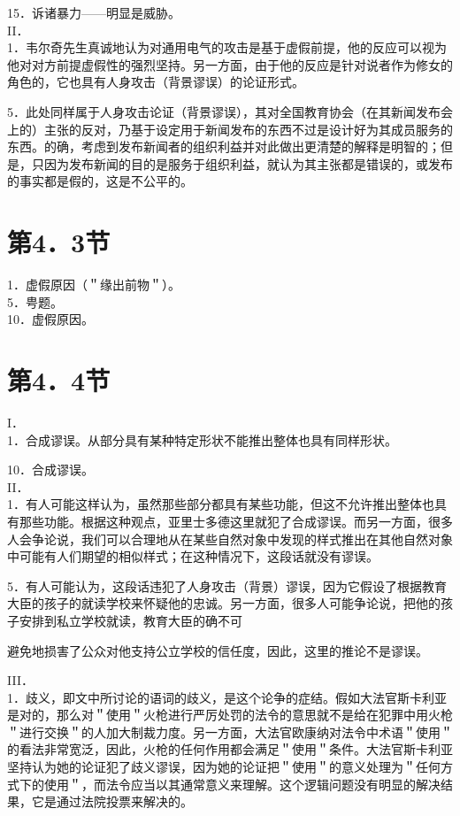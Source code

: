15．诉诸暴力——明显是威胁。\\
II．\\
1．韦尔奇先生真诚地认为对通用电气的攻击是基于虚假前提，他的反应可以视为他对对方前提虚假性的强烈坚持。另一方面，由于他的反应是针对说者作为修女的角色的，它也具有人身攻击（背景谬误）的论证形式。

5．此处同样属于人身攻击论证（背景谬误），其对全国教育协会（在其新闻发布会上的）主张的反对，乃基于设定用于新闻发布的东西不过是设计好为其成员服务的东西。的确，考虑到发布新闻者的组织利益并对此做出更清楚的解释是明智的；但是，只因为发布新闻的目的是服务于组织利益，就认为其主张都是错误的，或发布的事实都是假的，这是不公平的。

\section*{第4．3节}
1．虚假原因（＂缘出前物＂）。\\
5．甹题。\\
10．虚假原因。

\section*{第4．4节}
I．\\
1．合成谬误。从部分具有某种特定形状不能推出整体也具有同样形状。

10．合成谬误。\\
II．\\
1．有人可能这样认为，虽然那些部分都具有某些功能，但这不允许推出整体也具有那些功能。根据这种观点，亚里士多德这里就犯了合成谬误。而另一方面，很多人会争论说，我们可以合理地从在某些自然对象中发现的样式推出在其他自然对象中可能有人们期望的相似样式；在这种情况下，这段话就没有谬误。

5．有人可能认为，这段话违犯了人身攻击（背景）谬误，因为它假设了根据教育大臣的孩子的就读学校来怀疑他的忠诚。另一方面，很多人可能争论说，把他的孩子安排到私立学校就读，教育大臣的确不可

避免地损害了公众对他支持公立学校的信任度，因此，这里的推论不是谬误。

III．\\
1．歧义，即文中所讨论的语词的歧义，是这个论争的症结。假如大法官斯卡利亚是对的，那么对＂使用＂火枪进行严厉处罚的法令的意思就不是给在犯罪中用火枪＂进行交换＂的人加大制裁力度。另一方面，大法官欧康纳对法令中术语＂使用＂的看法非常宽泛，因此，火枪的任何作用都会满足＂使用＂条件。大法官斯卡利亚坚持认为她的论证犯了歧义谬误，因为她的论证把＂使用＂的意义处理为＂任何方式下的使用＂，而法令应当以其通常意义来理解。这个逻辑问题没有明显的解决结果，它是通过法院投票来解决的。

